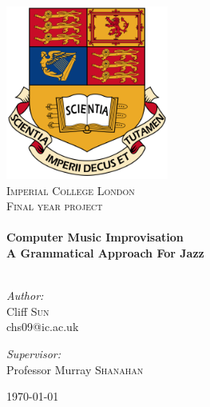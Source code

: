 \begin{titlepage}
\begin{center}

\includegraphics[width=0.4\textwidth]{figure/crest.png}~\\[1cm]

\textsc{\LARGE Imperial College London}\\[1.5cm]

\textsc{\Large Final year project}\\[0.5cm]

\HRule \\[0.4cm]
{ \huge \bfseries Computer Music Improvisation \\
A Grammatical Approach For Jazz}\\[0.4cm]

\HRule \\[1.5cm]

\begin{minipage}{0.4\textwidth}
\begin{flushleft} \large
\emph{Author:}\\
Cliff \textsc{Sun} \\
chs09@ic.ac.uk
\end{flushleft}
\end{minipage}
\begin{minipage}{0.4\textwidth}
\begin{flushright} \large
\emph{Supervisor:} \\
Professor Murray 
\textsc{Shanahan}
\end{flushright}
\end{minipage}

\vfill

{\large \today}

\end{center}
\end{titlepage}